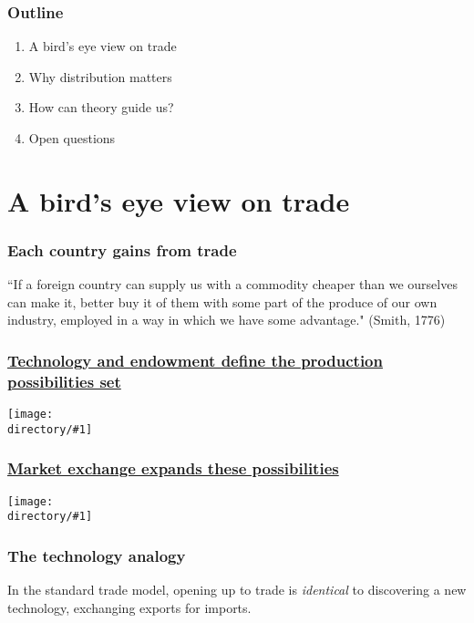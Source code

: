 \documentclass[aspectratio=169,compress,mathserif]{beamer}
\newcommand{\directory}{./exhibits}
\newcommand{\widefigure}[2]{\begin{frame}\frametitle{\hyperlink{#1back}{#2}}\hypertarget{#1}{{\begin{center}\texttt{[image: \\directory/\#1]}\end{center}}}\end{frame}}
\begin{document}
\begin{frame}\frametitle{Outline}\hypertarget{Outline}{}
\begin{enumerate}\setcounter{enumi}{0}
\item A bird's eye view on trade

\item Why distribution matters

\item How can theory guide us?

\item Open questions


\end{enumerate}
\end{frame}







\section{A bird's eye view on trade}\hypertarget{A bird's eye view on trade}{}
\begin{frame}\frametitle{Each country gains from trade}\hypertarget{Each country gains from trade}{}
``If a foreign country can supply us with a commodity cheaper than we ourselves can make it, better buy it of them with some part of the produce of our own industry, employed in a way in which we have some advantage." (Smith, 1776)


\end{frame}




\widefigure{PPF1}{Technology and endowment define the production possibilities set}
\widefigure{PPF2}{Market exchange expands these possibilities}


\begin{frame}\frametitle{The technology analogy}\hypertarget{The technology analogy}{}
In the standard trade model, opening up to trade is \emph{identical} to discovering a new technology, exchanging exports for imports.




\end{frame}
\end{document}
